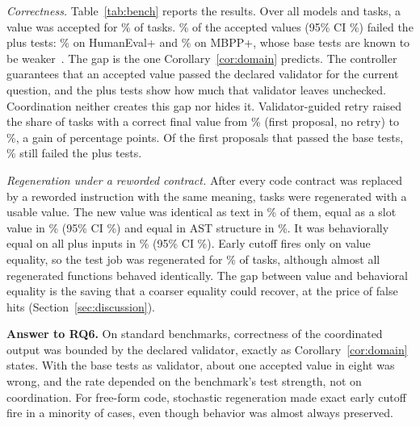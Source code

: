 

\emph{Correctness.} Table~\ref{tab:bench} reports the results. Over all models and tasks, a value was accepted for \BenchAcceptedPct\% of tasks. \BenchAcceptedWrongPct\% of the accepted values (95\% CI \BenchAcceptedWrongCI\%) failed the plus tests: \BenchAcceptedWrongHE\% on HumanEval+ and \BenchAcceptedWrongMBPP\% on MBPP+, whose base tests are known to be weaker~\cite{evalplus}. The gap is the one Corollary~\ref{cor:domain} predicts. The controller guarantees that an accepted value passed the declared validator for the current question, and the plus tests show how much that validator leaves unchecked. Coordination neither creates this gap nor hides it. Validator-guided retry raised the share of tasks with a correct final value from \BenchFirstCorrectPct\% (first proposal, no retry) to \BenchFinalCorrectPct\%, a gain of \BenchRetryGainPts{} percentage points. Of the first proposals that passed the base tests, \BenchFirstBaseWrongPct\% still failed the plus tests.

\emph{Regeneration under a reworded contract.} After every code contract was replaced by a reworded instruction with the same meaning, \BenchRegenN{} tasks were regenerated with a usable value. The new value was identical as text in \BenchByteEqualPct\% of them, equal as a slot value in \BenchValueEqualPct\% (95\% CI \BenchValueEqualCI\%) and equal in AST structure in \BenchAstEqualPct\%. It was behaviorally equal on all plus inputs in \BenchBehEqualPct\% (95\% CI \BenchBehEqualCI\%). Early cutoff fires only on value equality, so the test job was regenerated for \BenchTestsRegenPct\% of tasks, although almost all regenerated functions behaved identically. The gap between value and behavioral equality is the saving that a coarser equality could recover, at the price of false hits (Section~\ref{sec:discussion}).

\textbf{Answer to RQ6.} On standard benchmarks, correctness of the coordinated output was bounded by the declared validator, exactly as Corollary~\ref{cor:domain} states. With the base tests as validator, about one accepted value in eight was wrong, and the rate depended on the benchmark's test strength, not on coordination. For free-form code, stochastic regeneration made exact early cutoff fire in a minority of cases, even though behavior was almost always preserved.
